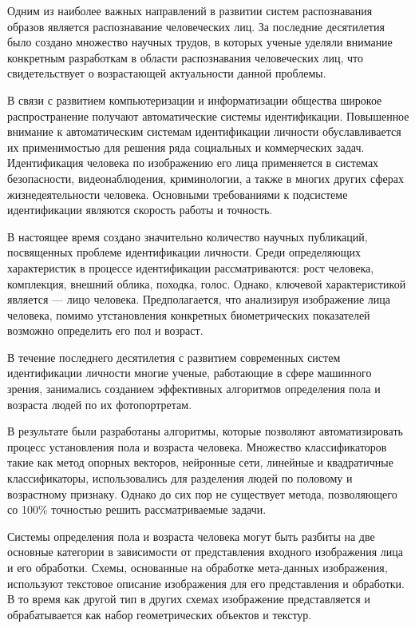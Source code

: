 \Introduction

Одним из наиболее важных направлений в развитии систем распознавания образов
является распознавание человеческих лиц. За последние десятилетия было создано
множество научных трудов, в которых ученые уделяли внимание конкретным
разработкам в области распознавания человеческих лиц, что свидетельствует о
возрастающей актуальности данной проблемы.

В связи с развитием компьютеризации и информатизации общества широкое
распространение получают автоматические системы идентификации. Повышенное
внимание к автоматическим системам идентификации личности обуславливается их
применимостью для решения ряда социальных и коммерческих задач. Идентификация
человека по изображению его лица применяется в системах безопасности,
видеонаблюдения, криминологии, а также в многих других сферах жизнедеятельности
человека. Основными требованиями к подсистеме идентификации являются скорость
работы и точность. 

В настоящее время создано значительно количество научных публикаций,
посвященных проблеме идентификации личности. Среди определяющих характеристик в
процессе идентификации рассматриваются: рост человека, комплекция, внешний
облика, походка, голос. Однако, ключевой характеристикой является --- лицо
человека. Предполагается, что анализируя изображение лица человека,
помимо утстановления конкретных биометрических показателей возможно определить
его пол и возраст. 

В течение последнего десятилетия с развитием современных систем идентификации
личности многие ученые, работающие в сфере машинного зрения, занимались
созданием эффективных алгоритмов определения пола и возраста людей по их
фотопортретам.

В результате были разработаны алгоритмы, которые позволяют автоматизировать
процесс установления пола и возраста человека. Множество классификаторов такие
как метод опорных векторов, нейронные сети, линейные и квадратичные
классификаторы, использовались для разделения людей по половому и возрастному
признаку. Однако до сих пор не существует метода, позволяющего со 100\%
точностью решить рассматриваемые задачи. 

Системы определения пола и возраста человека могут быть разбиты на две основные
категории в зависимости от представления входного изображения лица и его
обработки. Схемы, основанные на обработке мета-данных изображения, используют
текстовое описание изображения для его представления и обработки. В то время как
другой тип в других схемах изображение представляется и обрабатывается как набор
геометрических объектов и текстур.

